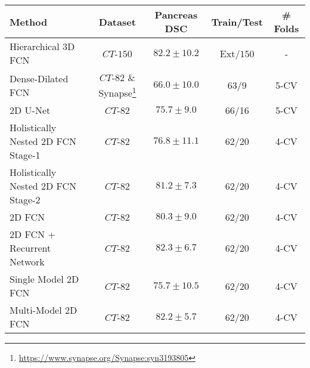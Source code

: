 \documentclass{article}
\begin{document}
\begin{table}\footnotesize
	\parbox{\textwidth}{
		\centering
		\label{tab:state_of_the_art_methods}
		\vspace{1 mm}
		\begin{tabular}{@{\extracolsep{1pt}}lcccc@{}} 
			Method  & Dataset & Pancreas DSC & Train/Test & \# Folds \\ \midrule
			
			Hierarchical 3D FCN \cite{roth2017hierarchical} & $CT$-$150$ & $82.2\pm10.2$ & Ext/$150$ & -\\
			
			Dense-Dilated FCN \cite{gibson2017towards} & $CT$-$82$ \& Synapse\footnote{\url{https://www.synapse.org/Synapse:syn3193805}} & $66.0\pm10.0$ & $63$/$9$ & 5-CV\\
			
			2D U-Net \cite{heinrich2018ternarynet} & $CT$-$82$ & $75.7\pm9.0$ & 66/16 & 5-CV\\ 
			
			Holistically Nested 2D FCN Stage-1\cite{roth2018media} & $CT$-$82$ & $76.8 \pm 11.1$ & 62/20& 4-CV\\
			
			Holistically Nested 2D FCN Stage-2\cite{roth2018media} & $CT$-$82$ & $81.2 \pm 7.3$ & 62/20& 4-CV\\
			
			2D FCN \cite{cai2017improving} & $CT$-$82$ & $80.3\pm9.0$ & 62/20 & 4-CV\\
			
			2D FCN + Recurrent Network \cite{cai2017improving} & $CT$-$82$ & $82.3 \pm 6.7$ & 62/20 & 4-CV\\
			
			Single Model 2D FCN \cite{zhou2017fixed} & $CT$-$82$ & $75.7 \pm 10.5$ & 62/20 & 4-CV\\
			
			Multi-Model 2D FCN \cite{zhou2017fixed} & $CT$-$82$ & $82.2 \pm 5.7$ & 62/20 & 4-CV\\
			
			\midrule
		\end{tabular}
	}
\end{table}
\end{document}
